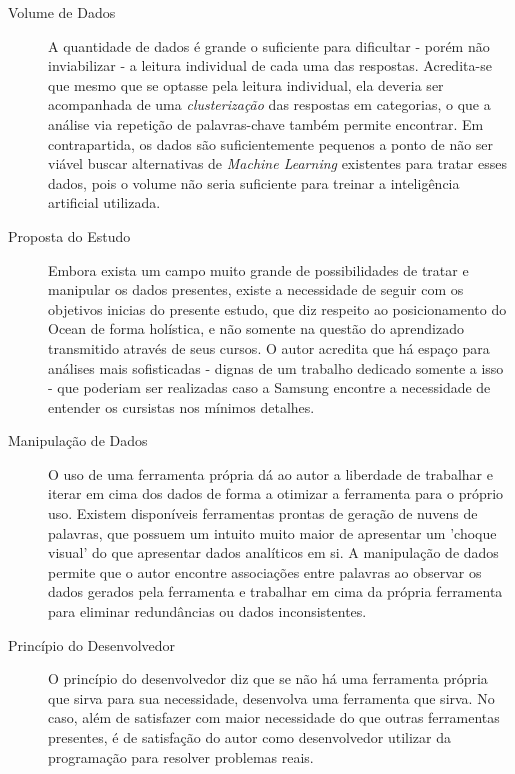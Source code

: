 \begin{description}
\item [Volume de Dados] A quantidade de dados é grande o suficiente para dificultar - porém não inviabilizar - a leitura individual de cada uma das respostas. Acredita-se que mesmo que se optasse pela leitura individual, ela deveria ser acompanhada de uma \textit{clusterização} das respostas em categorias, o que a análise via repetição de palavras-chave também permite encontrar. Em contrapartida, os dados são suficientemente pequenos a ponto de não ser viável buscar alternativas  de \textit{Machine Learning} existentes para tratar esses dados, pois o volume não seria suficiente para treinar a inteligência artificial utilizada.

\item [Proposta do Estudo] Embora exista um campo muito grande de possibilidades de tratar e manipular os dados presentes, existe a necessidade de seguir com os objetivos inicias do presente estudo, que diz respeito ao posicionamento do Ocean de forma holística, e não somente na questão do aprendizado transmitido através de seus cursos. O autor acredita que há espaço para análises mais sofisticadas - dignas de um trabalho dedicado somente a isso - que poderiam ser realizadas caso a Samsung encontre a necessidade de entender os cursistas nos mínimos detalhes.

\item [Manipulação de Dados] O uso de uma ferramenta própria dá ao autor a liberdade de trabalhar e iterar em cima dos dados de forma a otimizar a ferramenta para o próprio uso. Existem disponíveis ferramentas prontas de geração de nuvens de palavras, que possuem um intuito muito maior de apresentar um 'choque visual' do que apresentar dados analíticos em si. A manipulação de dados permite que o autor encontre associações entre palavras ao observar os dados gerados pela ferramenta e trabalhar em cima da própria ferramenta para eliminar redundâncias ou dados inconsistentes.

\item [Princípio do Desenvolvedor] O princípio do desenvolvedor diz que se não há uma ferramenta própria que sirva para sua necessidade, desenvolva uma ferramenta que sirva. No caso, além de satisfazer com maior necessidade do que outras ferramentas presentes, é de satisfação do autor como desenvolvedor utilizar da programação para resolver problemas reais.
 
\end{description}

